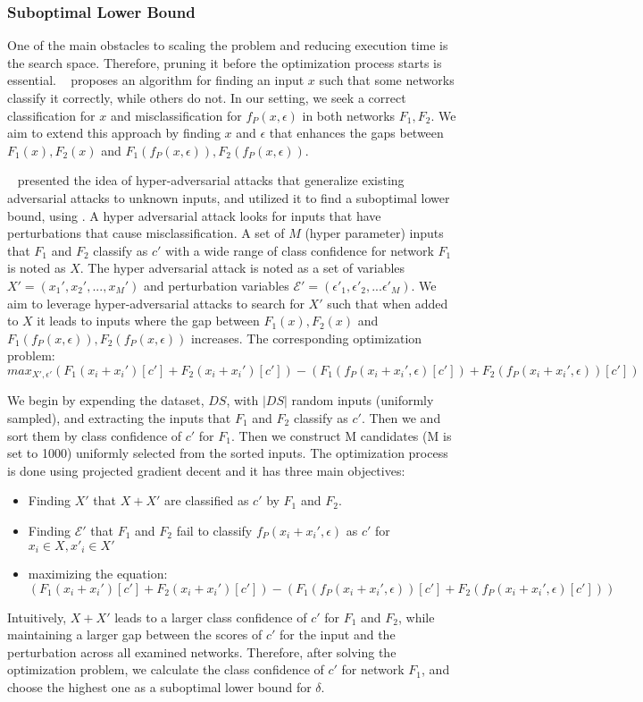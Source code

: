 \subsubsection{Suboptimal Lower Bound}
One of the main obstacles to scaling the problem and reducing execution time is the search space. Therefore, pruning it before the optimization process starts is essential.
~\cite{DEEPXPLORE} proposes an algorithm for finding an input $x$ such that some networks classify it correctly, while others do not. In our setting, we seek a correct classification for $x$ and misclassification for  $f_P(x,\epsilon)$ in both networks $F_1,F_2$. We aim to extend this approach by finding $x$ and $\epsilon$ that enhances the gaps between $F_1(x),F_2(x)$ and $F_1(f_P(x,\epsilon)),F_2(f_P(x,\epsilon))$.

~\cite{VHAGAR} presented the idea of hyper-adversarial attacks that generalize existing adversarial attacks to unknown inputs, and utilized it to find a suboptimal lower bound, using . A hyper adversarial attack looks for inputs that have perturbations that cause misclassification.
A set of $M$ (hyper parameter) inputs that $F_1$ and $F_2$ classify as $c'$ with a wide range of class confidence for network $F_1$ is noted as $X$. The hyper adversarial attack is noted as a set of variables $X'=(x_1',x_2',...,x_M')$ and perturbation variables $\mathcal{E}'=(\epsilon'_1,\epsilon'_2,...\epsilon'_M)$. We aim to leverage hyper-adversarial attacks to search for $X'$ such that when added to $X$ it leads to inputs where the gap between $F_1(x),F_2(x)$ and $F_1(f_P(x,\epsilon)),F_2(f_P(x,\epsilon))$ increases.
The corresponding optimization problem:
$$max_{X',\epsilon'} (F_1(x_i+x_i')[c']+F_2(x_i+x_i')[c'])-(F_1(f_P(x_i+x_i',\epsilon)[c'])+F_2(f_P(x_i+x_i',\epsilon))[c'])$$

We begin by expending the dataset, $DS$, with $|DS|$ random inputs (uniformly sampled), and extracting the inputs that $F_1$ and $F_2$ classify as $c'$. Then we and sort them by class confidence of $c'$ for $F_1$. Then we construct M candidates (M is set to 1000) uniformly selected from the sorted inputs. The optimization process is done using projected gradient decent and it has three main objectives:
\begin{itemize}
    \item Finding $X'$ that $X+X'$ are classified as $c'$ by $F_1$ and $F_2$.
    \item Finding $\mathcal{E}'$ that $F_1$ and $F_2$ fail to classify $f_P(x_i+x_i',\epsilon)$ as $c'$ for $x_i\in{X},x'_i\in{X'}$
    \item maximizing the equation: $(F_1(x_i+x_i')[c']+F_2(x_i+x_i')[c'])-(F_1(f_P(x_i+x_i',\epsilon))[c']+F_2(f_P(x_i+x_i',\epsilon)[c']))$
\end{itemize}
Intuitively, $X+X'$ leads to a larger class confidence of $c'$ for $F_1$ and $F_2$, while maintaining a larger gap between the scores of $c'$ for the input and the perturbation across all examined networks. Therefore, after solving the optimization problem, we calculate the class confidence of $c'$ for network $F_1$, and choose the highest one as a suboptimal lower bound for $\delta$. 
